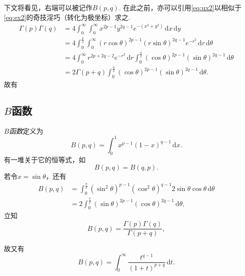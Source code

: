 \documentclass[UTF-8]{ctexart}
\newcommand{\notion}{\emph}
\newcommand{\dr}{\mathrm{d}}
\newcommand{\pare}[1]{\left(#1\right)}
\newcommand{\intt}[2]{\int_0^\infty #1 \, \dr #2}
\newcommand{\intu}[3]{\int_0^{#1} #2 \, \dr #3}
\newcommand{\rc}{r\cos\theta}
\newcommand{\rs}{r\sin\theta}
\newtheorem{reflection}{反射}
\newcommand{\refl}[1]{\vspace{0.5em}\par\noindent\fbox{%
    \parbox{\textwidth}{%
    \begin{reflection}
        #1
    \end{reflection}
    }%
}\vspace{0.5em}\par}
\begin{document}
  下文将看见，右端可以被记作$B\pare{p,q}$. 在此之前，亦可以引用\ref{eq:ux2}以相似于\ref{eq:ex2}的奇技淫巧（转化为极坐标）求之.
  \begin{align*}
    \Gamma\pare{p}\Gamma\pare{q} &= 4\intt{\intt{x^{2p-1}y^{2q-1}e^{-\pare{x^2+y^2}}}{x}}{y} \\
    &= 4 \intu{\frac{\pi}{2}}{\intt{\pare{\rc}^{2p-1}\pare{\rs}^{2q-1}e^{-r^2}}{r}}{\theta} \\
    &= 4 \intt{r^{2p+2q-2}e^{-r^2}}{r}\intu{\frac{\pi}{2}}{\pare{\cos\theta}^{2p-1}\pare{\sin\theta}^{2q-1}}{\theta} \\
    &= 2\Gamma\pare{p+q}\intu{\frac{\pi}{2}}{\pare{\cos\theta}^{2p-1}\pare{\sin\theta}^{2q-1}}{\theta}.
  \end{align*}
  故有
  \refl{
  \[ \frac{\Gamma\pare{p}\Gamma\pare{q}}{\Gamma\pare{p+q}}  = 2\intu{\frac{\pi}{2}}{\pare{\cos\theta}^{2p-1}\pare{\sin\theta}^{2q-1}}{\theta}. \]}
  \subsection{$B$函数}
  \notion{$B$函数}定义为
  \[ B\pare{p,q} = \intu{1}{x^{p-1}\pare{1-x}^{q-1}}{x}. \]
  有一堆关于它的恒等式，如
  \[ B\pare{p,q} = B\pare{q,p}. \]
  若令$x=\sin\theta$，还有
  \begin{align}
  \label{eq:bsc}
    B\pare{p,q} &= \intu{\frac{\pi}{2}}{\pare{\sin^2\theta}^{p-1}\pare{\cos^2\theta}^{q-1}2\sin\theta\cos\theta}{\theta} \\
    &= 2 \intu{\frac{\pi}{2}}{\pare{\sin\theta}^{2p-1}\pare{\cos\theta}^{2q-1}}{\theta},
  \end{align}
  立知
  \[ B\pare{p,q} = \frac{\Gamma\pare{p}\Gamma\pare{q}}{\Gamma\pare{p+q}}, \]
  \refl{
  \[ \frac{\Gamma\pare{p}\Gamma\pare{q}}{\Gamma\pare{p+q}} = \intu{1}{x^{p-1}\pare{1-x}^{q-1}}{x}. \]
  }
  故又有
  \[ B\pare{p,q} = \intt{\frac{t^{q-1}}{\pare{1+t}^{p+q}}}{t}. \]
\end{document}
